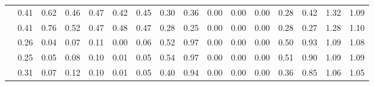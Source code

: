 \begin{tabular}{|c*{15}{|r}|}
\parbox[c][6ex][c]{7cm}{\centering{}}
 & 0.41 & 0.62 & 0.46 & 0.47 & 0.42 & 0.45 & 0.30 & 0.36 & 0.00 & 0.00 & 0.00 & 0.28 & 0.42 & 1.32 & 1.09\\[2ex]
\parbox[c][6ex][c]{7cm}{\centering{}}
 & 0.41 & 0.76 & 0.52 & 0.47 & 0.48 & 0.47 & 0.28 & 0.25 & 0.00 & 0.00 & 0.00 & 0.28 & 0.27 & 1.28 & 1.10\\[2ex]
\hline
\parbox[c][6ex][c]{7cm}{\centering{}}
 & 0.26 & 0.04 & 0.07 & 0.11 & 0.00 & 0.06 & 0.52 & 0.97 & 0.00 & 0.00 & 0.00 & 0.50 & 0.93 & 1.09 & 1.08\\[2ex]
\parbox[c][6ex][c]{7cm}{\centering{}}
 & 0.25 & 0.05 & 0.08 & 0.10 & 0.01 & 0.05 & 0.54 & 0.97 & 0.00 & 0.00 & 0.00 & 0.51 & 0.90 & 1.09 & 1.09\\[2ex]
\parbox[c][6ex][c]{7cm}{\centering{}}
 & 0.31 & 0.07 & 0.12 & 0.10 & 0.01 & 0.05 & 0.40 & 0.94 & 0.00 & 0.00 & 0.00 & 0.36 & 0.85 & 1.06 & 1.05\\[2ex]
\hline
\end{tabular}

